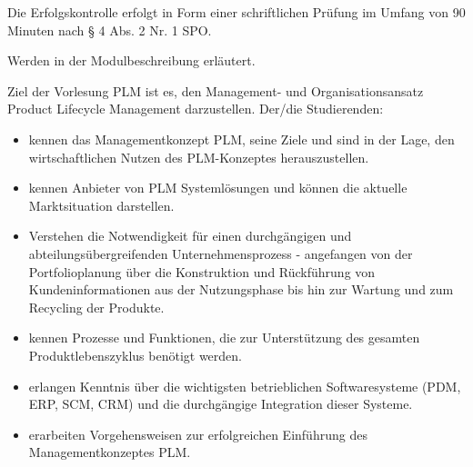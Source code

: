 \begin{course}

\setdoclanguagegerman
{}



\coursehead


\label{cour_7495.dp_997}


\begin{styleenv}
\begin{assessment}
Die Erfolgskontrolle erfolgt in Form einer schriftlichen Prüfung im Umfang von 90 Minuten nach § 4 Abs. 2 Nr. 1 SPO.


\end{assessment}

\begin{conditions}Werden in der Modulbeschreibung erläutert.

\end{conditions}


\end{styleenv}

\begin{learningoutcomes}
Ziel der Vorlesung PLM ist es, den Management- und Organisationsansatz Product Lifecycle Management darzustellen. Der/die Studierenden:

 \begin{itemize}\item kennen das Managementkonzept PLM, seine Ziele und sind in der Lage, den wirtschaftlichen Nutzen des PLM-Konzeptes herauszustellen.  \item kennen Anbieter von PLM Systemlösungen und können die aktuelle Marktsituation darstellen.  \item Verstehen die Notwendigkeit für einen durchgängigen und abteilungsübergreifenden Unternehmensprozess - angefangen von der Portfolioplanung über die Konstruktion und Rückführung von Kundeninformationen aus der Nutzungsphase bis hin zur Wartung und zum Recycling der Produkte.  \item kennen Prozesse und Funktionen, die zur Unterstützung des gesamten Produktlebenszyklus benötigt werden.  \item erlangen Kenntnis über die wichtigsten betrieblichen Softwaresysteme (PDM, ERP, SCM, CRM) und die durchgängige Integration dieser Systeme.  \item erarbeiten Vorgehensweisen zur erfolgreichen Einführung des Managementkonzeptes PLM.  \end{itemize}
\end{learningoutcomes}


\end{course}
